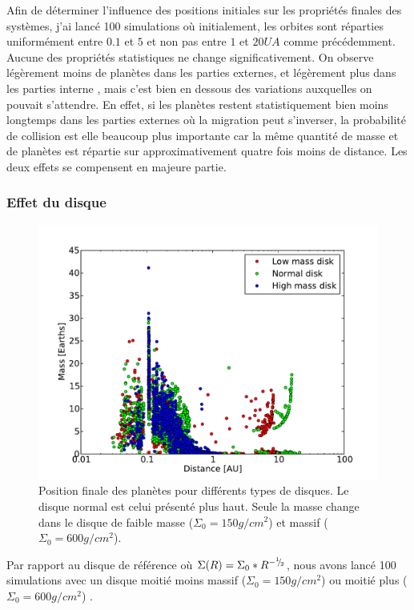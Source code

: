 Afin de déterminer l'influence des positions initiales sur les propriétés finales des systèmes, j'ai lancé 100 simulations où initialement, les orbites sont réparties uniformément entre $0.1$ et $5$ et non pas entre $1$ et $20\unit{UA}$ comme précédemment. Aucune des propriétés statistiques ne change significativement. On observe légèrement moins de planètes dans les parties externes, et légèrement plus dans les parties interne , mais c'est bien en dessous des variations auxquelles on pouvait s'attendre. En effet, si les planètes restent statistiquement bien moins longtemps dans les parties externes où la migration peut s'inverser, la probabilité de collision est elle beaucoup plus importante car la même quantité de masse et de planètes est répartie sur approximativement quatre fois moins de distance. Les deux effets se compensent en majeure partie. 

\subsubsection{Effet du disque}
\begin{figure}[htbp]
\centering
\includegraphics[width=0.8\linewidth]{figure/HSE/HSE_disk_effect.pdf}
\caption{Position finale des planètes pour différents types de disques. Le disque normal est celui présenté plus haut. Seule la masse change dans le disque de faible masse ($\Sigma_0=150\unit{g/cm^2}$) et massif ($\Sigma_0=600\unit{g/cm^2}$).}\label{fig:HSE_disk_effect}
\end{figure}

Par rapport au disque de référence où $\Sigma(R) = \Sigma_0 * R^{-{{}^{1\!\!}/ _{\!2}}}$, nous avons lancé 100 simulations avec un disque moitié moins massif ($\Sigma_0=150\unit{g/cm^2}$) ou moitié plus ($\Sigma_0=600\unit{g/cm^2}$) .

